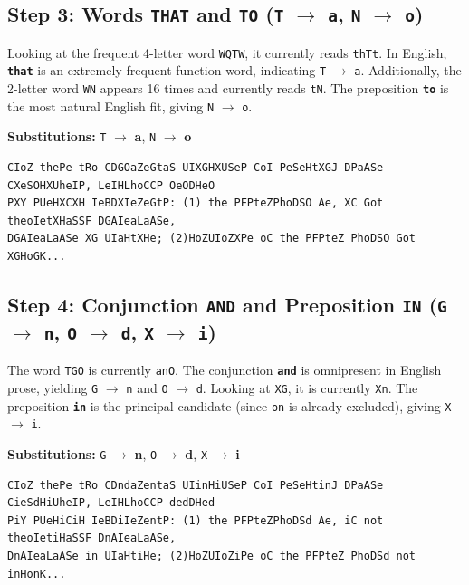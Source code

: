 \documentclass[12pt,a4paper]{article}
\begin{document}
\subsection{Step 3: Words \texttt{THAT} and \texttt{TO} (\texorpdfstring{\texttt{T} $\to$ \texttt{a}, \texttt{N} $\to$ \texttt{o}}{T -> a, N -> o})}
Looking at the frequent 4-letter word \texttt{WQTW}, it currently reads \texttt{thTt}. In English, \textbf{\texttt{that}} is an extremely frequent function word, indicating \texttt{T} $\to$ \texttt{a}.
Additionally, the 2-letter word \texttt{WN} appears 16 times and currently reads \texttt{tN}. The preposition \textbf{\texttt{to}} is the most natural English fit, giving \texttt{N} $\to$ \texttt{o}.
\begin{center}
    \textbf{Substitutions:} \texttt{T} $\to$ \textbf{a}, \texttt{N} $\to$ \textbf{o}
\end{center}

\begin{lstlisting}[caption={Text snippet after Step 3}]
CIoZ thePe tRo CDGOaZeGtaS UIXGHXUSeP CoI PeSeHtXGJ DPaASe CXeSOHXUheIP, LeIHLhoCCP OeODHeO 
PXY PUeHXCXH IeBDXIeZeGtP: (1) the PFPteZPhoDSO Ae, XC Got theoIetXHaSSF DGAIeaLaASe, 
DGAIeaLaASe XG UIaHtXHe; (2)HoZUIoZXPe oC the PFPteZ PhoDSO Got XGHoGK...
\end{lstlisting}

\subsection{Step 4: Conjunction \texttt{AND} and Preposition \texttt{IN} (\texorpdfstring{\texttt{G} $\to$ \texttt{n}, \texttt{O} $\to$ \texttt{d}, \texttt{X} $\to$ \texttt{i}}{G -> n, O -> d, X -> i})}
The word \texttt{TGO} is currently \texttt{anO}. The conjunction \textbf{\texttt{and}} is omnipresent in English prose, yielding \texttt{G} $\to$ \texttt{n} and \texttt{O} $\to$ \texttt{d}.
Looking at \texttt{XG}, it is currently \texttt{Xn}. The preposition \textbf{\texttt{in}} is the principal candidate (since \texttt{on} is already excluded), giving \texttt{X} $\to$ \texttt{i}.
\begin{center}
    \textbf{Substitutions:} \texttt{G} $\to$ \textbf{n}, \texttt{O} $\to$ \textbf{d}, \texttt{X} $\to$ \textbf{i}
\end{center}

\begin{lstlisting}[caption={Text snippet after Step 4}]
CIoZ thePe tRo CDndaZentaS UIinHiUSeP CoI PeSeHtinJ DPaASe CieSdHiUheIP, LeIHLhoCCP dedDHed 
PiY PUeHiCiH IeBDiIeZentP: (1) the PFPteZPhoDSd Ae, iC not theoIetiHaSSF DnAIeaLaASe, 
DnAIeaLaASe in UIaHtiHe; (2)HoZUIoZiPe oC the PFPteZ PhoDSd not inHonK...
\end{lstlisting}
\end{document}
